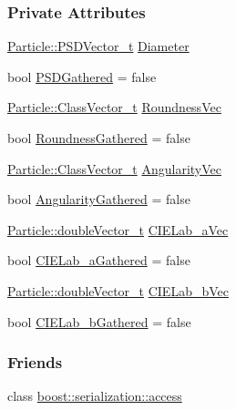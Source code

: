 \subsubsection*{Private Attributes}
\begin{DoxyCompactItemize}
\item 
\hyperlink{class_soil_analyzer_1_1_particle_aba1003586622fdf1dbc87c0dabc46f1d}{Particle\+::\+P\+S\+D\+Vector\+\_\+t} \hyperlink{class_soil_analyzer_1_1_sample_a466996e4055155a1d6a6843828c5c205}{Diameter}
\item 
bool \hyperlink{class_soil_analyzer_1_1_sample_adf8e50111eab12d06ba4fc8eac00469f}{P\+S\+D\+Gathered} = false
\item 
\hyperlink{class_soil_analyzer_1_1_particle_ad2038e90ac83a1cbd34a28e8fdefbfdc}{Particle\+::\+Class\+Vector\+\_\+t} \hyperlink{class_soil_analyzer_1_1_sample_a3f8898ff104d915b706ebbed37bac055}{Roundness\+Vec}
\item 
bool \hyperlink{class_soil_analyzer_1_1_sample_ae2fc7565d25978ea639e4f273d7b9bd4}{Roundness\+Gathered} = false
\item 
\hyperlink{class_soil_analyzer_1_1_particle_ad2038e90ac83a1cbd34a28e8fdefbfdc}{Particle\+::\+Class\+Vector\+\_\+t} \hyperlink{class_soil_analyzer_1_1_sample_acca7131a8f178a96e70ed597772243a6}{Angularity\+Vec}
\item 
bool \hyperlink{class_soil_analyzer_1_1_sample_ace7a85e29feb581a1f667d370daad886}{Angularity\+Gathered} = false
\item 
\hyperlink{class_soil_analyzer_1_1_particle_a4ae1bf667c41c7df60cc933e9e5f82eb}{Particle\+::double\+Vector\+\_\+t} \hyperlink{class_soil_analyzer_1_1_sample_ad5c684c7875dd7b5daca94925e469005}{C\+I\+E\+Lab\+\_\+a\+Vec}
\item 
bool \hyperlink{class_soil_analyzer_1_1_sample_a359783d2f39e5233ed4383dd28e8c477}{C\+I\+E\+Lab\+\_\+a\+Gathered} = false
\item 
\hyperlink{class_soil_analyzer_1_1_particle_a4ae1bf667c41c7df60cc933e9e5f82eb}{Particle\+::double\+Vector\+\_\+t} \hyperlink{class_soil_analyzer_1_1_sample_a7d39c10c64aa4815264e70fb96360448}{C\+I\+E\+Lab\+\_\+b\+Vec}
\item 
bool \hyperlink{class_soil_analyzer_1_1_sample_a579a9c20e5011249037f28faae8a6415}{C\+I\+E\+Lab\+\_\+b\+Gathered} = false
\end{DoxyCompactItemize}
\subsubsection*{Friends}
\begin{DoxyCompactItemize}
\item 
class \hyperlink{class_soil_analyzer_1_1_sample_ac98d07dd8f7b70e16ccb9a01abf56b9c}{boost\+::serialization\+::access}
\end{DoxyCompactItemize}


